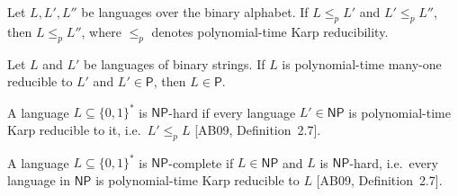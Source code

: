 \begin{theorem}
\label{Complexity.PolyTimeReducible.trans}
\leanok
{}
Let $L,L',L''$ be languages over the binary alphabet. If $L\le_p L'$ and $L'\le_p L''$,
then $L\le_p L''$, where $\le_p$ denotes polynomial-time Karp reducibility.
\end{theorem}

\begin{theorem}
\label{Complexity.mem_P_of_polyTimeReducible}
\leanok
{}
Let $L$ and $L'$ be languages of binary strings. If $L$ is polynomial-time many-one
reducible to $L'$ and $L'\in\mathsf{P}$, then $L\in\mathsf{P}$.
\end{theorem}

\begin{definition}
\label{Complexity.NPHard}
\leanok
{}
A language $L \subseteq \{0,1\}^{*}$ is $\mathsf{NP}$-hard if every language
$L' \in \mathsf{NP}$ is polynomial-time Karp reducible to it, i.e.\
$L' \le_p L$ [AB09, Definition~2.7].
\end{definition}

\begin{definition}
\label{Complexity.NPComplete}
\leanok
{}
A language $L \subseteq \{0,1\}^{*}$ is $\mathsf{NP}$-complete if
$L \in \mathsf{NP}$ and $L$ is $\mathsf{NP}$-hard, i.e.\ every language in
$\mathsf{NP}$ is polynomial-time Karp reducible to $L$ [AB09, Definition~2.7].
\end{definition}


